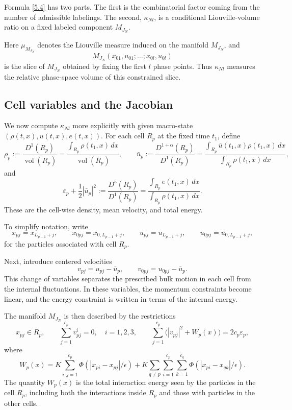 \documentclass[11pt]{article}
\begin{document}
Formula \eqref{5.4} has two parts. The first is the combinatorial factor coming from the number of admissible labelings. The second, $\kappa_{Nl}$, is a conditional Liouville-volume ratio on a fixed labeled component $M_{J_N}$.

Here $\mu_{M_{J_N}}$ denotes the Liouville measure induced on the manifold $M_{J_N}$, and
\[
M_{J_N}(x_{01},u_{01};\dots;x_{0l},u_{0l})
\]
is the slice of $M_{J_N}$ obtained by fixing the first $l$ phase points. Thus $\kappa_{Nl}$ measures the relative phase-space volume of this constrained slice.

\subsection{Cell variables and the Jacobian}

We now compute $\kappa_{Nl}$ more explicitly with given macro-state $(\rho(t,x),u(t,x),e(t,x))$. For each cell $R_p$ at the fixed time $t_1$, define
\begin{equation}
\rho_p
:=
\frac{D^1(R_p)}{\operatorname{vol}(R_p)}
=
\frac{\int_{R_p}\rho(t_1,x)\,dx}{\operatorname{vol}(R_p)},
\qquad
\bar u_p
:=
\frac{D^{1+\alpha}(R_p)}{D^1(R_p)}
=
\frac{\int_{R_p}\bar u(t_1,x)\rho(t_1,x)\,dx}{\int_{R_p}\rho(t_1,x)\,dx},
\tag{5.6}\label{5.6}
\end{equation}
and
\[
\varepsilon_p+\frac12|\bar u_p|^2
:=
\frac{D^5(R_p)}{D^1(R_p)}
=
\frac{\int_{R_p}e(t_1,x)\,dx}{\int_{R_p}\rho(t_1,x)\,dx}.
\]
These are the cell-wise density, mean velocity, and total energy.

To simplify notation, write
\begin{equation}
x_{pj}=x_{L_{p-1}+j},
\qquad
x_{0pj}=x_{0,L_{p-1}+j},
\qquad
u_{pj}=u_{L_{p-1}+j},
\qquad
u_{0pj}=u_{0,L_{p-1}+j},
\tag{5.8}\label{5.8}
\end{equation}
for the particles associated with cell $R_p$.

Next, introduce centered velocities
\begin{equation}
v_{pj}=u_{pj}-\bar u_p,
\qquad
v_{0pj}=u_{0pj}-\bar u_p.
\tag{5.9}\label{5.9}
\end{equation}
This change of variables separates the prescribed bulk motion in each cell from the internal fluctuations. In these variables, the momentum constraints become linear, and the energy constraint is written in terms of the internal energy.

The manifold $M_{J_N}$ is then described by the restrictions
\begin{equation}
x_{pj}\in R_p,
\qquad
\sum_{j=1}^{c_p}v_{pj}^i=0,\quad i=1,2,3,
\qquad
\sum_{j=1}^{c_p}\bigl(|v_{pj}|^2+W_p(x)\bigr)=2c_p\varepsilon_p,
\tag{5.10}\label{5.10}
\end{equation}
where
\[
W_p(x)
=
K\sum_{i,j=1}^{c_p}\Phi(|x_{pi}-x_{pj}|/\epsilon)
+
K\sum_{q\neq p}\sum_{i=1}^{c_p}\sum_{k=1}^{c_q}
\Phi(|x_{pi}-x_{qk}|/\epsilon).
\]
The quantity $W_p(x)$ is the total interaction energy seen by the particles in the cell $R_p$, including both the interactions inside $R_p$ and those with particles in the other cells.
\end{document}

